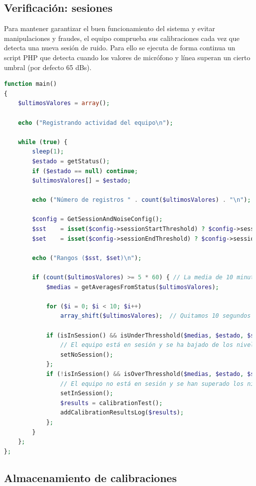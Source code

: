 \clearpage
\subsection{Verificación: sesiones} \label{sec:lms7-sesiones}

Para mantener garantizar el buen funcionamiento del sistema y evitar manipulaciones y fraudes, el equipo comprueba sus calibraciones cada vez que detecta una nueva sesión de ruido. Para ello se ejecuta de forma continua un script PHP que detecta cuando los valores de micrófono y línea superan un cierto umbral (por defecto 65 dBs). \\

\begin{lstlisting}[language=php, caption=Script de control de sesiones.]
function main()
{
    $ultimosValores = array();

    echo ("Registrando actividad del equipo\n");

    while (true) {
        sleep(1);
        $estado = getStatus();
        if ($estado == null) continue;
        $ultimosValores[] = $estado;

        echo ("Número de registros " . count($ultimosValores) . "\n");

        $config = GetSessionAndNoiseConfig();
        $sst    = isset($config->sessionStartThreshold) ? $config->sessionStartThreshold : 65;
        $set    = isset($config->sessionEndThreshold) ? $config->sessionEndThreshold : 65;

        echo ("Rangos ($sst, $set)\n");

        if (count($ultimosValores) >= 5 * 60) { // La media de 10 minutos
            $medias = getAveragesFromStatus($ultimosValores);

            for ($i = 0; $i < 10; $i++)
                array_shift($ultimosValores);  // Quitamos 10 segundos de lecturas

            if (isInSession() && isUnderThresshold($medias, $estado, $set)) {
                // El equipo está en sesión y se ha bajado de los niveles
                setNoSession();
            };
            if (!isInSession() && isOverThresshold($medias, $estado, $sst)) {
                // El equipo no está en sesión y se han superado los niveles.
                setInSession();
                $results = calibrationTest();
                addCalibrationResultsLog($results);
            };
        }
    };
};
\end{lstlisting}

\subsection{Almacenamiento de calibraciones}

